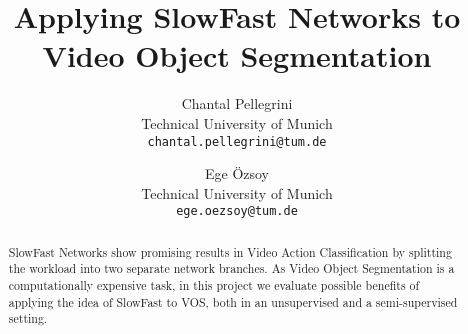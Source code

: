 \documentclass[10pt,twocolumn,letterpaper]{article}
\begin{document}
\title{Applying SlowFast Networks to Video Object Segmentation}

\author{Chantal Pellegrini\\
Technical University of Munich\\
{\tt\small chantal.pellegrini@tum.de}
\and
Ege Özsoy\\
	Technical University of Munich\\
	{\tt\small ege.oezsoy@tum.de}
}

\maketitle

\begin{abstract}
SlowFast Networks \cite{slow_fast} show promising results in Video Action Classification by splitting the workload into two separate network branches. As Video Object Segmentation is a computationally expensive task, in this project we evaluate possible benefits of applying the idea of SlowFast to VOS, both in an unsupervised and a semi-supervised setting.
\end{abstract}








{\small


}
\end{document}
